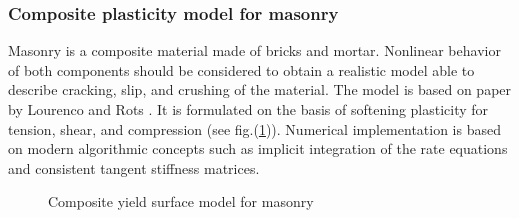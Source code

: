 \documentclass[epsf,a4paper]{article}
\begin{document}
\subsubsection{Composite plasticity model for masonry}
Masonry is a composite material made of bricks and mortar. Nonlinear behavior of both components should be considered to obtain a realistic model able to describe cracking, slip, and crushing of the material. The model is based on paper by Lourenco and Rots \cite{Rots}. It is formulated on the basis of softening plasticity for tension, shear, and compression (see fig.(\ref{compyieldsurffig})). Numerical implementation is based on modern algorithmic concepts such as implicit integration of the rate equations and consistent tangent stiffness matrices. 

\begin{figure}
  \centerline{}
  \caption{Composite yield surface model for masonry}
  \label{compyieldsurffig}
\end{figure}
\end{document}
